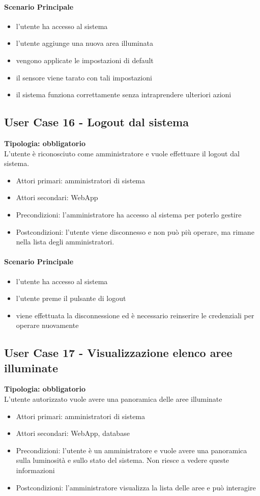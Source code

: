 \documentclass[12pt]{article}
\begin{document}
\paragraph{Scenario Principale}
\begin{itemize}
	\item l'utente ha accesso al sistema
	\item l'utente aggiunge una nuova area illuminata
	\item vengono applicate le impostazioni di default
	\item il sensore viene tarato con tali impostazioni
	\item il sistema funziona correttamente senza intraprendere ulteriori azioni
\end{itemize}

\subsection{User Case 16 - Logout dal sistema}
\textbf{Tipologia: obbligatorio} \\
L'utente è riconosciuto come amministratore e vuole effettuare il logout dal sistema.
\begin{itemize}
	\item Attori primari: amministratori di sistema
	\item Attori secondari: WebApp
	\item Precondizioni: l'amministratore ha accesso al sistema per poterlo gestire
	\item Postcondizioni: l'utente viene disconnesso e non può più operare, ma rimane nella lista degli amministratori.
\end{itemize}
\paragraph{Scenario Principale}
\begin{itemize}
	\item l'utente ha accesso al sistema
	\item l'utente preme il pulsante di logout
	\item viene effettuata la disconnessione ed è necessario reinserire le credenziali per operare nuovamente
\end{itemize}

\subsection{User Case 17 - Visualizzazione elenco aree illuminate}
\textbf{Tipologia: obbligatorio} \\
L'utente autorizzato vuole avere una panoramica delle aree illuminate
\begin{itemize}
	\item Attori primari: amministratori di sistema
	\item Attori secondari: WebApp, database
	\item Precondizioni: l'utente è un amministratore e vuole avere una panoramica sulla luminosità e sullo stato del sistema. Non riesce a vedere queste informazioni
	\item Postcondizioni: l'amministratore visualizza la lista delle aree e può interagire
\end{itemize}
\end{document}
